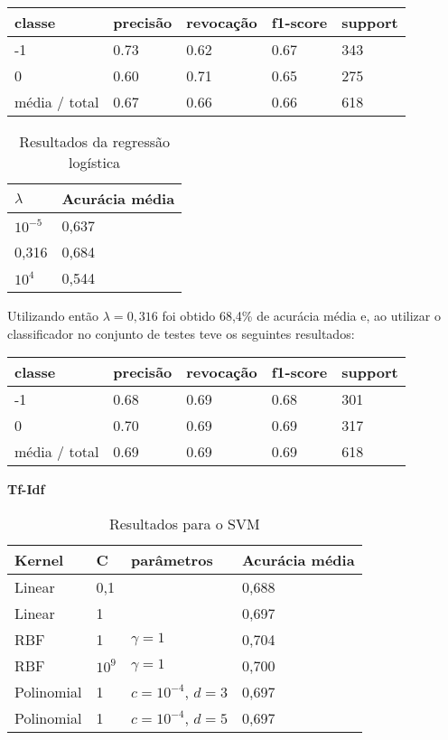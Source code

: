 \begin{table}[H]
	\centering
		\begin{tabular}{l | l | l | l | l}
		\hline
		classe  	&	precisão  &  revocação &  f1-score &  support \\
		\hline
		 -1    &   0.73   &   0.62   &   0.67   &    343 \\
		 \hline
          0    &   0.60   &   0.71   &   0.65   &    275 \\
		\hline
		média / total   &    0.67   &   0.66   &   0.66   &    618 \\
		\hline
	\end{tabular}
\end{table}


\begin{table}[H]
	\centering
	\caption{Resultados da regressão logística}
	\begin{tabular}{l l}
		\hline
		$\lambda$ & Acurácia média \\
		\hline
		$10^{-5}$ & 0,637 \\
		\hline
		0,316 & 0,684 \\
		\hline
		$10^{4}$ & 0,544 \\
	\end{tabular}
\end{table}

Utilizando então $\lambda = 0,316$ foi obtido 68,4\% de acurácia média e, ao utilizar
o classificador no conjunto de testes teve os seguintes resultados:

\begin{table}[H]
	\centering
		\begin{tabular}{l | l | l | l | l}
		\hline
		classe  	&	precisão  &  revocação &  f1-score &  support \\
		\hline
		 -1    &   0.68   &   0.69   &   0.68   &    301 \\
		 \hline
          0    &   0.70   &   0.69   &   0.69   &    317 \\
		\hline
		média / total   &    0.69   &   0.69   &   0.69   &    618 \\
		\hline
	\end{tabular}
\end{table}

\textbf{Tf-Idf}

\begin{table}[H]
	\centering
	\caption{Resultados para o SVM}
	\begin{tabular}{l l l l}
		\hline
		Kernel & C & parâmetros & Acurácia média \\
		\hline
		Linear & 0,1 & & 0,688 \\
		\hline
		Linear & 1 & & 0,697 \\
		\hline
		RBF & 1 & $\gamma = 1$ & 0,704 \\
		\hline
		RBF & $10^{9}$ & $\gamma = 1$ & 0,700 \\
		\hline
		Polinomial & 1 & $c = 10^{-4}$, $d = 3$ & 0,697 \\
		\hline
		Polinomial & 1 & $c = 10^{-4}$, $d = 5$ & 0,697 \\
		\hline
	\end{tabular}
\end{table}

